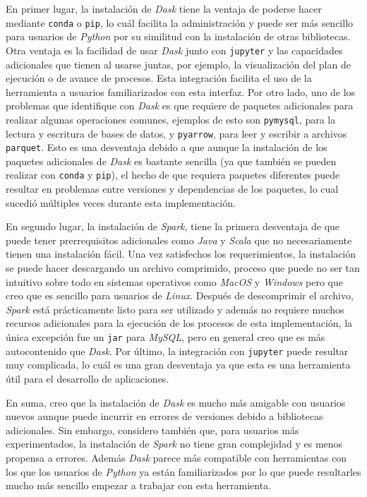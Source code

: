 En primer lugar, la instalación de \textit{Dask} tiene la ventaja de poderse hacer mediante \texttt{conda} o \texttt{pip}, lo cuál facilita la administración y puede ser más sencillo para usuarios de \textit{Python} por su similitud con la instalación de otras bibliotecas. Otra ventaja es la facilidad de usar \textit{Dask} junto con \texttt{jupyter} y las capacidades adicionales que tienen al usarse juntas, por ejemplo, la visualización del plan de ejecución o de avance de procesos. Esta integración facilita el uso de la herramienta a usuarios familiarizados con esta interfaz. Por otro lado, uno de los problemas que identifique con \textit{Dask} es que requiere de paquetes adicionales para realizar algunas operaciones comunes, ejemplos de esto son \texttt{pymysql}, para la lectura y escritura de bases de datos, y \texttt{pyarrow}, para leer y escribir a archivos \texttt{parquet}. Esto es una desventaja debido a que aunque la instalación de los paquetes adicionales de \textit{Dask} es bastante sencilla (ya que también se pueden realizar con \texttt{conda} y \texttt{pip}), el hecho de que requiera paquetes diferentes puede resultar en problemas entre versiones y dependencias de los paquetes, lo cual sucedió múltiples veces durante esta implementación.

En segundo lugar, la instalación de \textit{Spark}, tiene la primera desventaja de que puede tener prerrequisitos adicionales como \textit{Java} y \textit{Scala} que no necesariamente tienen una instalación fácil. Una vez satisfechos los requerimientos, la instalación se puede hacer descargando un archivo comprimido, proceso que puede no ser tan intuitivo sobre todo en sistemas operativos como \textit{MacOS} y \textit{Windows} pero que creo que es sencillo para usuarios de \textit{Linux}. Después de descomprimir el archivo, \textit{Spark} está prácticamente listo para ser utilizado y además no requiere muchos recursos adicionales para la ejecución de los procesos de esta implementación, la única excepción fue un \texttt{jar} para \textit{MySQL}, pero en general creo que es más autocontenido que \textit{Dask}. Por último, la integración con \texttt{jupyter} puede resultar muy complicada, lo cuál es una gran desventaja ya que esta es una herramienta útil para el desarrollo de aplicaciones.

En suma, creo que la instalación de \textit{Dask} es mucho más amigable con usuarios nuevos aunque puede incurrir en errores de versiones debido a bibliotecas adicionales. Sin embargo, considero también que, para usuarios más experimentados, la instalación de \textit{Spark} no tiene gran complejidad y es menos propensa a errores. Además \textit{Dask} parece más compatible con herramientas con los que los usuarios de \textit{Python} ya están familiarizados por lo que puede resultarles mucho más sencillo empezar a trabajar con esta herramienta. 

